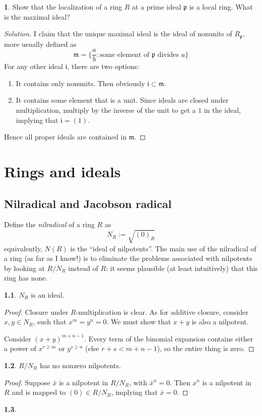 \documentclass{book}
\newcommand{\fr}[1]{\mathfrak #1}
\theoremstyle{definition}
\theoremstyle{block}
\newtheorem{block}{}[section]
\newtheorem{block*}[block]{}
\theoremstyle{thm}
\begin{document}
\begin{block*}
  Show that the localization of a ring $R$ at a prime ideal $\fr p$ is a local
  ring. What is the maximal ideal?
\end{block*}
\begin{proof}[Solution]
  I claim that the unique maximal ideal is the ideal of nonunits of $R_{\fr p}$,
  more usually defined as
  \[
    \fr m = \{\frac a b : \text{some element of } \fr p \text { divides } a\}
  \]
  For any other ideal $\fr i$, there are two options:
  \begin{enumerate}[label=(\alph*)]
    \item It contains only nonunits. Then obviously $\fr i \subset \fr m$.
    \item It contains some element that is a unit. Since ideals are closed under
      multiplication, multiply by the inverse of the unit to get a $1$ in the
      ideal, implying that $\fr i = (1)$.
  \end{enumerate}
  Hence all proper ideals are contained in $\fr m$.
\end{proof}

\chapter{Rings and ideals}

\section{Nilradical and Jacobson radical}
Define the \textit{nilradical} of a ring $R$ as \[N_R:=\sqrt{(0)_R}\]
equivalently, $N(R)$ is the ``ideal of nilpotents''. The main use of the
nilradical of a ring (as far as I know!) is to eliminate the problems associated
with nilpotents by looking at $R/N_R$ instead of $R$: it seems plausible (at
least intuitively) that this ring has none.

\begin{block}
  $N_R$ is an ideal.
\end{block}
\begin{proof}
  Closure under $R$-multiplication is clear. As for additive closure, consider
  $x,y\in N_R$, such that $x^m = y^n = 0$. We must show that $x+y$ is also a
  nilpotent.\par
  Consider $(x+y)^{m+n-1}$. Every term of the binomial expansion contains either
  a power of $x^{r\geq m}$ or $y^{s\geq n}$ (else $r+s<m+n-1$), so the entire thing is zero.
\end{proof}

\begin{block}
  $R/N_R$ has no nonzero nilpotents.
\end{block}
\begin{proof}
  Suppose $\bar x$ is a nilpotent in $R/N_R$, with ${\bar x}^n=0$. Then $x^n$ is
  a nilpotent in $R$ and is mapped to $(0)\in R/N_R$, implying that $\bar x = 0$. 
\end{proof}

\begin{block}\end{block}
\end{document}
